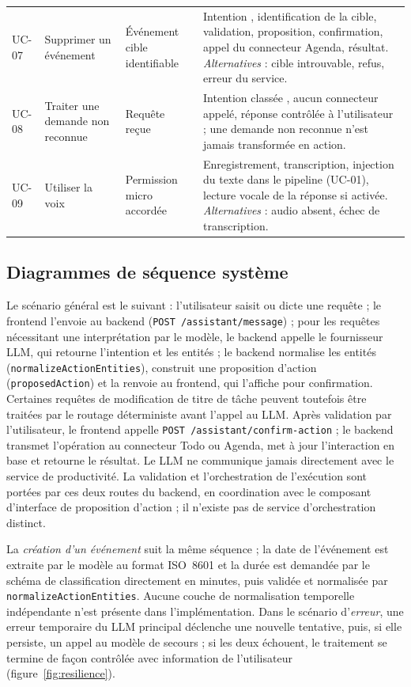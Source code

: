 \documentclass[11pt,a4paper,openany,oneside]{report}
\newcommand{\intent}[1]{\texttt{\detokenize{#1}}}
\begin{document}
\begin{table}[htbp]
\begin{tabularx}{\textwidth}{@{}p{0.9cm}p{2.1cm}p{2.7cm}X@{}}
UC-07 & Supprimer un événement & Événement cible identifiable & Intention \intent{delete_event}, identification de la cible, validation, proposition, confirmation, appel du connecteur Agenda, résultat. \emph{Alternatives} : cible introuvable, refus, erreur du service. \\
UC-08 & Traiter une demande non reconnue & Requête reçue & Intention classée \intent{unrecognized}, aucun connecteur appelé, réponse contrôlée à l'utilisateur ; une demande non reconnue n'est jamais transformée en action. \\
UC-09 & Utiliser la voix & Permission micro accordée & Enregistrement, transcription, injection du texte dans le pipeline (UC-01), lecture vocale de la réponse si activée. \emph{Alternatives} : audio absent, échec de transcription. \\
\bottomrule
\end{tabularx}
\end{table}

\subsection{Diagrammes de séquence système}
Le scénario général est le suivant : l'utilisateur saisit ou dicte une requête ; le frontend l'envoie au backend (\texttt{POST /assistant/message}) ; pour les requêtes nécessitant une interprétation par le modèle, le backend appelle le fournisseur LLM, qui retourne l'intention et les entités ; le backend normalise les entités (\texttt{normalizeActionEntities}), construit une proposition d'action (\texttt{proposedAction}) et la renvoie au frontend, qui l'affiche pour confirmation. Certaines requêtes de modification de titre de tâche peuvent toutefois être traitées par le routage déterministe avant l'appel au LLM. Après validation par l'utilisateur, le frontend appelle \texttt{POST /assistant/confirm-action} ; le backend transmet l'opération au connecteur Todo ou Agenda, met à jour l'interaction en base et retourne le résultat. Le LLM ne communique jamais directement avec le service de productivité. La validation et l'orchestration de l'exécution sont portées par ces deux routes du backend, en coordination avec le composant d'interface de proposition d'action ; il n'existe pas de service d'orchestration distinct.

La \emph{création d'un événement} suit la même séquence ; la date de l'événement est extraite par le modèle au format ISO~8601 et la durée est demandée par le schéma de classification directement en minutes, puis validée et normalisée par \texttt{normalizeActionEntities}. Aucune couche de normalisation temporelle indépendante n'est présente dans l'implémentation. Dans le scénario d'\emph{erreur}, une erreur temporaire du LLM principal déclenche une nouvelle tentative, puis, si elle persiste, un appel au modèle de secours ; si les deux échouent, le traitement se termine de façon contrôlée avec information de l'utilisateur (figure~\ref{fig:resilience}).
\end{document}
